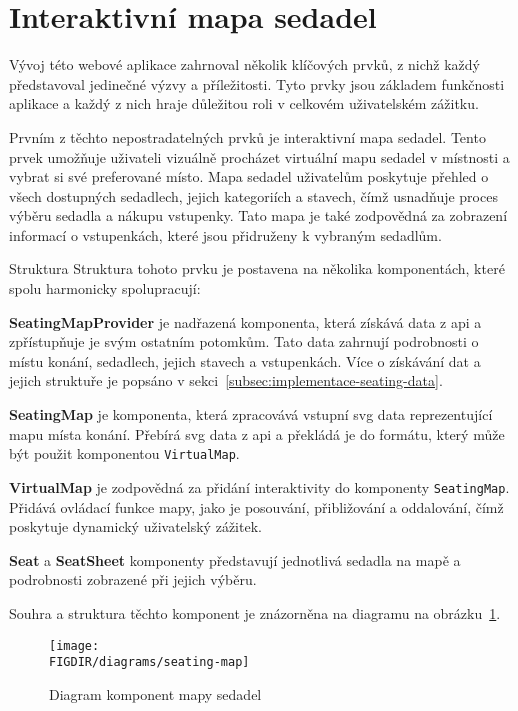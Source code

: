 \section{Interaktivní mapa sedadel}
\label{sec:implementace-seating}
Vývoj této webové aplikace zahrnoval několik klíčových prvků, z nichž každý představoval jedinečné výzvy a příležitosti.
Tyto prvky jsou základem funkčnosti aplikace a každý z nich hraje důležitou roli v celkovém uživatelském zážitku.

Prvním z těchto nepostradatelných prvků je interaktivní mapa sedadel.
Tento prvek umožňuje uživateli vizuálně procházet virtuální mapu sedadel v místnosti a vybrat si své preferované místo.
Mapa sedadel uživatelům poskytuje přehled o všech dostupných sedadlech, jejich kategoriích a stavech, čímž usnadňuje proces výběru sedadla a nákupu vstupenky.
Tato mapa je také zodpovědná za zobrazení informací o vstupenkách, které jsou přidruženy k vybraným sedadlům.

\begin{subsection}{Struktura}
    \label{subsec:implementace-seating-struktura}
    Struktura tohoto prvku je postavena na několika komponentách, které spolu harmonicky spolupracují:

    \textbf{SeatingMapProvider} je nadřazená komponenta, která získává data z \ac{api} a zpřístupňuje je svým ostatním potomkům.
    Tato data zahrnují podrobnosti o místu konání, sedadlech, jejich stavech a vstupenkách.
    Více o získávání dat a jejich struktuře je popsáno v sekci~\ref{subsec:implementace-seating-data}.

    \textbf{SeatingMap} je komponenta, která zpracovává vstupní \ac{svg} data reprezentující mapu místa konání.
    Přebírá \ac{svg} data z \ac{api} a překládá je do formátu, který může být použit komponentou \texttt{VirtualMap}.

    \textbf{VirtualMap} je zodpovědná za přidání interaktivity do komponenty \texttt{SeatingMap}.
    Přidává ovládací funkce mapy, jako je posouvání, přibližování a oddalování, čímž poskytuje dynamický uživatelský zážitek.

    \textbf{Seat} a \textbf{SeatSheet} komponenty představují jednotlivá sedadla na mapě a podrobnosti zobrazené při jejich výběru.

    Souhra a struktura těchto komponent je znázorněna na diagramu na obrázku~\ref{fig:seating-map-structure}.

    \begin{figure}[H]
        \centering
        \texttt{[image: \\FIGDIR/diagrams/seating-map]}
        \caption{Diagram komponent mapy sedadel}
        \label{fig:seating-map-structure}
    \end{figure}
\end{subsection}

